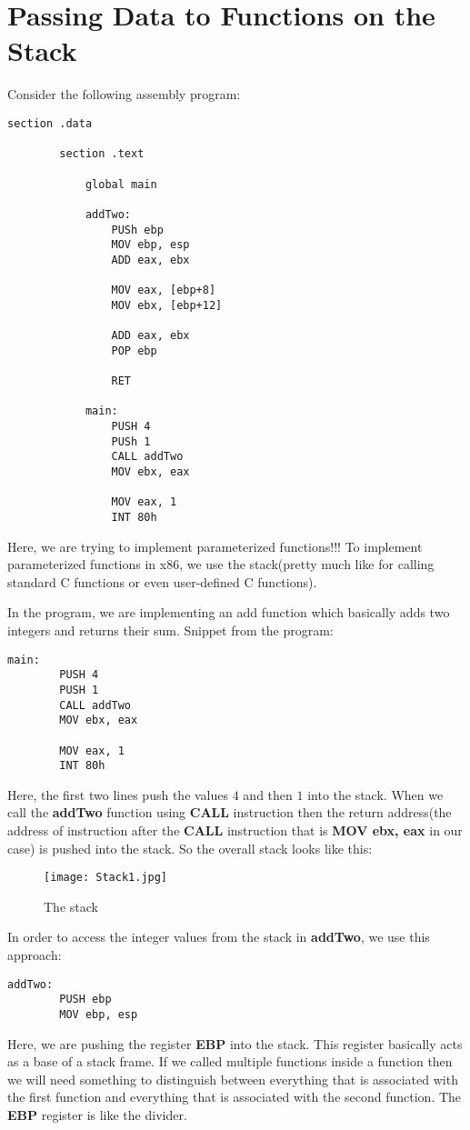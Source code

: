 \documentclass{article}
\makeatletter
\renewcommand\paragraph{\@startsection{paragraph}{4}{\z@}{-3.25ex \@plus -1ex \@minus -.2ex}{1.5ex \@plus .2ex}{\normalfont\normalsize\bfseries}}
\makeatother
\begin{document}
	\section{Passing Data to Functions on the Stack}\label{sec:sec1}
	\paragraph{}
	Consider the following assembly program:
	
	\begin{lstlisting}[frame=single, breaklines=true]
		section .data
		
		section .text
		
			global main
			
			addTwo:
				PUSh ebp
				MOV ebp, esp
				ADD eax, ebx
				
				MOV eax, [ebp+8]
				MOV ebx, [ebp+12]
				
				ADD eax, ebx
				POP ebp
				
				RET
			
			main:
				PUSH 4
				PUSh 1
				CALL addTwo
				MOV ebx, eax
				
				MOV eax, 1
				INT 80h
	\end{lstlisting}

Here, we are trying to implement parameterized functions!!! To implement parameterized functions in x86, we use the stack(pretty much like for calling standard C functions or even user-defined C functions).

In the program, we are implementing an add function which basically adds two integers and returns their sum.
\newpage
Snippet from the program:
\begin{lstlisting}[frame=single, breaklines=true]
	main:
		PUSH 4
		PUSH 1
		CALL addTwo
		MOV ebx, eax
		
		MOV eax, 1
		INT 80h
\end{lstlisting}
Here, the first two lines push the values $4$ and then $1$ into the stack. When we call the \textbf{addTwo} function using \textbf{CALL} instruction then the return address(the address of instruction after the \textbf{CALL} instruction that is \textbf{MOV ebx, eax} in our case) is pushed into the stack. So the overall stack looks like this:
\begin{figure}[h]
	\centering
	\texttt{[image: Stack1.jpg]}
	\caption{The stack}
	\label{fig:fig1}
\end{figure}

In order to access the integer values from the stack in \textbf{addTwo}, we use this approach:
\begin{lstlisting}[frame=single, breaklines=true]
	addTwo:
		PUSH ebp
		MOV ebp, esp
\end{lstlisting}
Here, we are pushing the register \textbf{EBP} into the stack. This register basically acts as a base of a stack frame. If we called multiple functions inside a function then we will need something to distinguish between everything that is associated with the first function and everything that is associated with the second function. The \textbf{EBP} register is like the divider.
\end{document}

